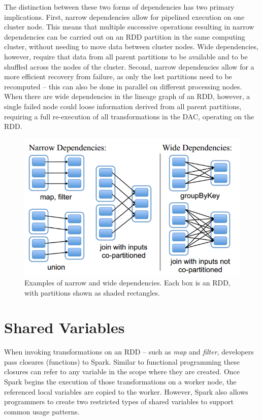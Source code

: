 \documentclass{l4proj}
\begin{document}
The distinction between these two forms of dependencies has two primary implications. First, narrow dependencies allow for pipelined execution on one cluster node. This means that multiple successive operations resulting in narrow dependencies can be carried out on an RDD partition in the same computing cluster, without needing to move data between cluster nodes. Wide dependencies, however, require that data from all parent partitions to be available and to be shuffled across the nodes of the cluster. Second, narrow dependencies allow for a more efficient recovery from failure, as only the lost partitions need to be recomputed -- this can also be done in parallel on different processing nodes. When there are wide dependencies in the lineage graph of an RDD, however, a single failed node could loose information derived from all parent partitions, requiring a full re-execution of all transformations in the DAC, operating on the RDD.

\begin{figure}[H]
\label{RDD dependencies}
\caption{Examples  of  narrow  and  wide  dependencies.  Each box is an RDD, with partitions shown as shaded rectangles.}
\includegraphics[width=1.0\textwidth]{images/rdd_dependency}
\end{figure}

\section{Shared Variables}

When invoking transformations on an RDD -- such as \textit{map} and \textit{filter}, developers pass closures (functions) to Spark. Similar to functional programming these closures can refer to any variable in the scope where they are created. Once Spark begins the execution of those transformations on a worker node, the referenced local variables are copied to the worker. However, Spark also allows programmers to create two restricted types of shared variables to support common usage patterns\cite{Spark}.
\end{document}

